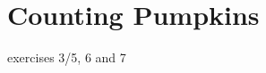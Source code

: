 \documentclass[../Head/Main.tex]{subfiles}
\begin{document}
\section{Counting Pumpkins}
exercises 3/5, 6 and 7
\end{document}
